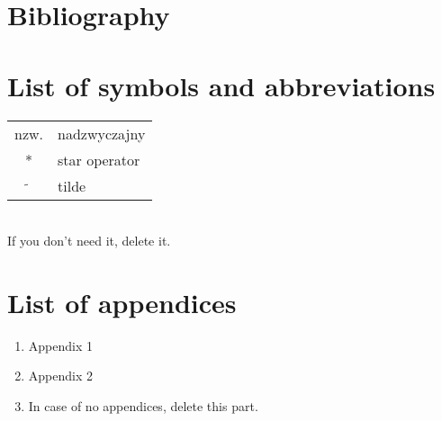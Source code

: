 \chapter{Bibliography}


\printbibliography[type=article,heading=subbibliography,title={Articles}]
\printbibliography[type=online,heading=subbibliography,title={Online}]

\chapter*{List of symbols and abbreviations}

\begin{tabular}{cl}
	nzw. & nadzwyczajny \\
	* & star operator \\
	$\widetilde{}$ & tilde 
\end{tabular}
\\
If you don't need it, delete it.
\thispagestyle{empty}

\chapter*{List of appendices}
\begin{enumerate}
	\item Appendix 1
	\item Appendix 2
	\item In case of no appendices, delete this part.
\end{enumerate}
\thispagestyle{empty}